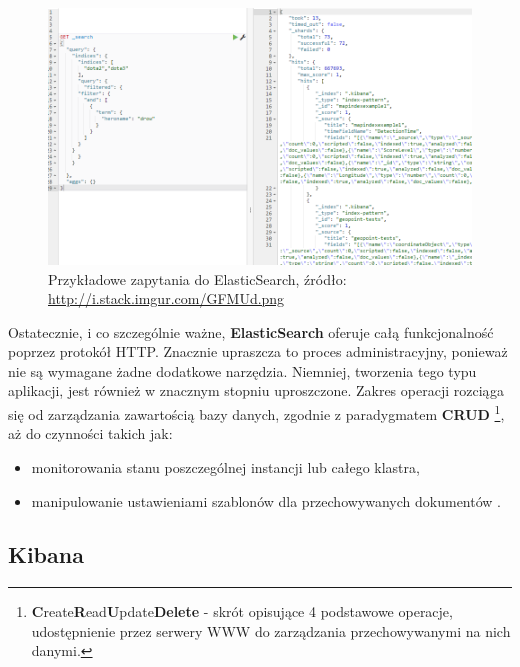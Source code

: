     \begin{figure}[h]
        \centering
        \includegraphics[width=1.0\textwidth]{images/es_query}
        \caption[Przykładowe zapytania do ElasticSearch]{
            Przykładowe zapytania do ElasticSearch, źródło: \url{http://i.stack.imgur.com/GFMUd.png}
        }
        \label{chapter:application:elkstack:es:query}
    \end{figure}
    
    Ostatecznie, i co szczególnie ważne, \textbf{ElasticSearch} oferuje całą funkcjonalność poprzez
    protokół HTTP. Znacznie upraszcza to proces administracyjny, ponieważ nie są wymagane żadne
    dodatkowe narzędzia. Niemniej, tworzenia tego typu aplikacji, jest również w znacznym stopniu uproszczone.
    Zakres operacji rozciąga się od zarządzania zawartością bazy danych, zgodnie z paradygmatem \textbf{CRUD}
    \footnote{\textbf{C}reate\textbf{R}ead\textbf{U}pdate\textbf{Delete} - skrót opisujące 4 podstawowe
        operacje, udostępnienie przez serwery WWW do zarządzania przechowywanymi na nich danymi.}, 
    aż do czynności takich jak:
    \begin{itemize}
        \item monitorowania stanu poszczególnej instancji lub całego klastra,
        \item manipulowanie ustawieniami szablonów dla przechowywanych dokumentów \cite{elastic_docs}.
    \end{itemize}

\clearpage

\subsection{Kibana}
\label{chapter:application:elkstack:kibana}

